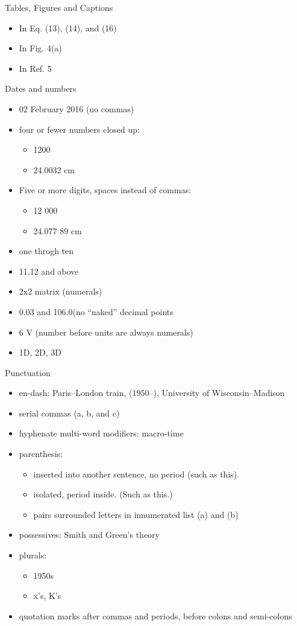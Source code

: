\documentclass[10pt, letter]{article}
\begin{document}
\begin{multicols}{2}
Tables, Figures and Captions
\begin{itemize}
\item In Eq. (13), (14), and (16)
\item In Fig. 4(a)
\item In Ref. 5
\end{itemize}

Dates and numbers
\begin{itemize}
\item 02 February 2016 (no commas) 
\item four or fewer numbers closed up:
  \begin{itemize}
  \item 1200
  \item 24.0032 cm
  \end{itemize}
\item Five or more digits, spaces instead of commas:
  \begin{itemize}
  \item 12 000
  \item 24.077 89 cm
  \end{itemize}
\item one throgh ten
\item 11,12 and above
\item 2x2 matrix (numerals)
\item 0.03 and 106.0(no ``naked'' decimal points
\item 6 V (number before units are always numerals)
\item 1D, 2D, 3D
\end{itemize}

Punctuation
\begin{itemize}
\item en-dash: Paris--London train, (1950--), University of Wisconsin--Madison
\item serial commas (a, b, and c)
\item hyphenate multi-word modifiers: macro-time
\item parenthesis:
  \begin{itemize}
  \item inserted into another sentence, no period (such as this).
  \item isolated, period inside. (Such as this.)
  \item pairs surrounded letters in innumerated list (a) and (b)
  \end{itemize}
\item possessives: Smith and Green's theory
\item plurals:
  \begin{itemize}
  \item 1950s
  \item x's, K's
  \end{itemize}
\item quotation marks after commas and periods, before colons and
  semi-colons
\end{itemize}


\end{multicols}
\end{document}

